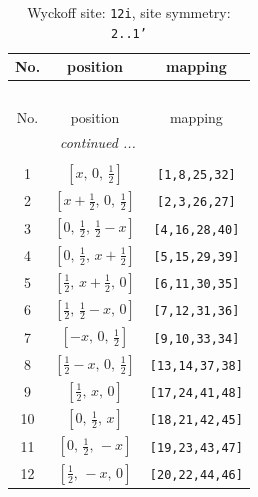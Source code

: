 \documentclass[fleqn,8pt]{jsarticle}
\begin{document}
\begin{longtable}{ccc}
\caption{Wyckoff site: {\tt 12i}, site symmetry: {\tt 2..1'}}
 \\
 \hline \hline
No. & position & mapping \\ \hline \endfirsthead

\multicolumn{2}{l}{\tablename\ \thetable{}} \\
 \hline \hline
No. & position & mapping \\ \hline \endhead

 \hline \hline
\multicolumn{2}{r}{\footnotesize\it continued ...} \\ \endfoot

 \hline \hline
\multicolumn{2}{r}{} \\ \endlastfoot

1 & $\left[ x,\, 0,\, \frac{1}{2} \right]$ & {\tt [1,8,25,32]} \\ \hline
2 & $\left[ x + \frac{1}{2},\, 0,\, \frac{1}{2} \right]$ & {\tt [2,3,26,27]} \\ \hline
3 & $\left[ 0,\, \frac{1}{2},\, \frac{1}{2} - x \right]$ & {\tt [4,16,28,40]} \\ \hline
4 & $\left[ 0,\, \frac{1}{2},\, x + \frac{1}{2} \right]$ & {\tt [5,15,29,39]} \\ \hline
5 & $\left[ \frac{1}{2},\, x + \frac{1}{2},\, 0 \right]$ & {\tt [6,11,30,35]} \\ \hline
6 & $\left[ \frac{1}{2},\, \frac{1}{2} - x,\, 0 \right]$ & {\tt [7,12,31,36]} \\ \hline
7 & $\left[ - x,\, 0,\, \frac{1}{2} \right]$ & {\tt [9,10,33,34]} \\ \hline
8 & $\left[ \frac{1}{2} - x,\, 0,\, \frac{1}{2} \right]$ & {\tt [13,14,37,38]} \\ \hline
9 & $\left[ \frac{1}{2},\, x,\, 0 \right]$ & {\tt [17,24,41,48]} \\ \hline
10 & $\left[ 0,\, \frac{1}{2},\, x \right]$ & {\tt [18,21,42,45]} \\ \hline
11 & $\left[ 0,\, \frac{1}{2},\, - x \right]$ & {\tt [19,23,43,47]} \\ \hline
12 & $\left[ \frac{1}{2},\, - x,\, 0 \right]$ & {\tt [20,22,44,46]} \\
\end{longtable}
\renewcommand{\arraystretch}{1.2}
\end{document}
